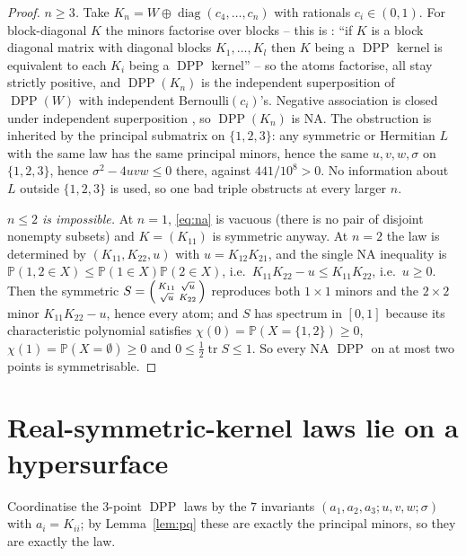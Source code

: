 \documentclass[11pt]{amsart}
\theoremstyle{remark}
\DeclareMathOperator{\DPP}{DPP}
\begin{document}
\begin{proof}
\emph{$n\ge3$.} Take $K_{n}=W\oplus\operatorname{diag}(c_{4},\dots,c_{n})$ with rationals
$c_{i}\in(0,1)$. For block-diagonal $K$ the minors factorise over blocks -- this is
\cite[\S2]{Poinas}: ``if $K$ is a block diagonal matrix with diagonal blocks
$K_{1},\dots,K_{l}$ then $K$ being a $\DPP$ kernel is equivalent to each $K_{i}$ being a
$\DPP$ kernel'' -- so the atoms factorise, all stay strictly positive, and $\DPP(K_{n})$ is
the independent superposition of $\DPP(W)$ with independent Bernoulli$(c_{i})$'s. Negative
association is closed under independent superposition \cite[property P7]{JDP}, so
$\DPP(K_{n})$ is NA. The obstruction is inherited by the principal submatrix on
$\{1,2,3\}$: any symmetric or Hermitian $L$ with the same law has the same principal minors,
hence the same $u,v,w,\sigma$ on $\{1,2,3\}$, hence $\sigma^{2}-4uvw\le0$ there, against
$441/10^{8}>0$. No information about $L$ outside $\{1,2,3\}$ is used, so one bad triple
obstructs at every larger $n$.

\emph{$n\le2$ is impossible.} At $n=1$, \eqref{eq:na} is vacuous (there is no pair of
disjoint nonempty subsets) and $K=(K_{11})$ is symmetric anyway. At $n=2$ the law is
determined by $(K_{11},K_{22},u)$ with $u=K_{12}K_{21}$, and the single NA inequality is
$\mathbb P(1,2\in X)\le\mathbb P(1\in X)\mathbb P(2\in X)$, i.e.\
$K_{11}K_{22}-u\le K_{11}K_{22}$, i.e.\ $u\ge0$. Then the symmetric
$S=\begin{psmallmatrix}K_{11}&\sqrt u\\ \sqrt u&K_{22}\end{psmallmatrix}$ reproduces both
$1\times1$ minors and the $2\times2$ minor $K_{11}K_{22}-u$, hence every atom; and $S$ has
spectrum in $[0,1]$ because its characteristic polynomial satisfies
$\chi(0)=\mathbb P(X=\{1,2\})\ge0$, $\chi(1)=\mathbb P(X=\emptyset)\ge0$ and
$0\le\tfrac12\operatorname{tr}S\le1$. So every NA $\DPP$ on at most two points is
symmetrisable.
\end{proof}

\section{Real-symmetric-kernel laws lie on a hypersurface}\label{sec:generic}

Coordinatise the $3$-point $\DPP$ laws by the $7$ invariants
$(a_{1},a_{2},a_{3};u,v,w;\sigma)$ with $a_{i}=K_{ii}$; by Lemma~\ref{lem:pq} these are exactly
the principal minors, so they are exactly the law.
\end{document}
